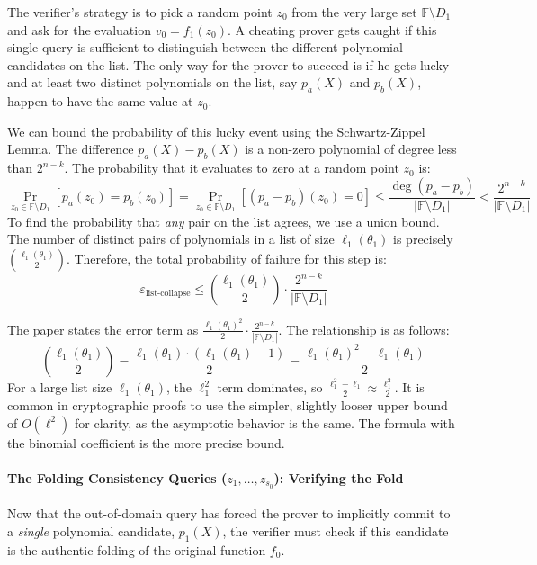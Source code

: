 \documentclass{article}
\begin{document}
The verifier's strategy is to pick a random point $z_0$ from the very large set $\mathbb{F} \setminus D_1$ and ask for the evaluation $v_0 = f_1(z_0)$. A cheating prover gets caught if this single query is sufficient to distinguish between the different polynomial candidates on the list. The only way for the prover to succeed is if he gets lucky and at least two distinct polynomials on the list, say $p_a(X)$ and $p_b(X)$, happen to have the same value at $z_0$.

We can bound the probability of this lucky event using the Schwartz-Zippel Lemma. The difference $p_a(X) - p_b(X)$ is a non-zero polynomial of degree less than $2^{n-k}$. The probability that it evaluates to zero at a random point $z_0$ is:
\[
\Pr_{z_0 \in \mathbb{F} \setminus D_1} [p_a(z_0) = p_b(z_0)] = \Pr_{z_0 \in \mathbb{F} \setminus D_1} [(p_a - p_b)(z_0) = 0] \le \frac{\deg(p_a - p_b)}{|\mathbb{F} \setminus D_1|} < \frac{2^{n-k}}{|\mathbb{F} \setminus D_1|}
\]
To find the probability that \textit{any} pair on the list agrees, we use a union bound. The number of distinct pairs of polynomials in a list of size $\ell_1(\theta_1)$ is precisely $\binom{\ell_1(\theta_1)}{2}$. Therefore, the total probability of failure for this step is:
\[
\varepsilon_{\text{list-collapse}} \le \binom{\ell_1(\theta_1)}{2} \cdot \frac{2^{n-k}}{|\mathbb{F} \setminus D_1|}
\]

\begin{tcolorbox}[breakable, title={Connecting to the Paper's Formula}]
The paper \cite{habock2024basefold} states the error term as $\frac{\ell_1(\theta_1)^2}{2} \cdot \frac{2^{n-k}}{|\mathbb{F} \setminus D_1|}$. The relationship is as follows:
\[
\binom{\ell_1(\theta_1)}{2} = \frac{\ell_1(\theta_1) \cdot (\ell_1(\theta_1) - 1)}{2} = \frac{\ell_1(\theta_1)^2 - \ell_1(\theta_1)}{2}
\]
For a large list size $\ell_1(\theta_1)$, the $\ell_1^2$ term dominates, so $\frac{\ell_1^2 - \ell_1}{2} \approx \frac{\ell_1^2}{2}$. It is common in cryptographic proofs to use the simpler, slightly looser upper bound of $O(\ell^2)$ for clarity, as the asymptotic behavior is the same. The formula with the binomial coefficient is the more precise bound.
\end{tcolorbox}

\paragraph{The Folding Consistency Queries ($z_1, \dots, z_{s_0}$): Verifying the Fold}
Now that the out-of-domain query has forced the prover to implicitly commit to a \textit{single} polynomial candidate, $p_1(X)$, the verifier must check if this candidate is the authentic folding of the original function $f_0$.
\end{document}
